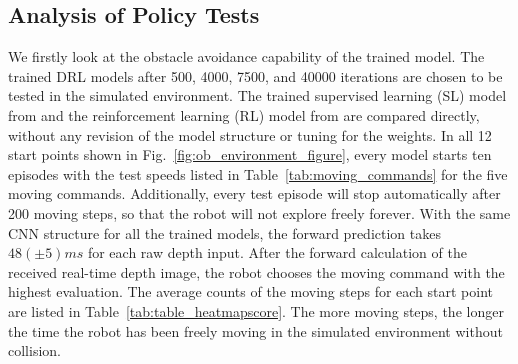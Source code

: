 \subsection{Analysis of Policy Tests} \label{sec:analysis}


We firstly look at the obstacle avoidance capability of the trained model. The trained DRL models after 500, 4000, 7500, and 40000 iterations are chosen to be tested in the simulated environment. The trained supervised learning (SL) model from \cite{tai2016deep} and the reinforcement learning (RL) model from \cite{tl_rcar_2016} are compared directly, without any revision of the model structure or tuning for the weights. In all 12 start points shown in Fig.~\ref{fig:ob_environment_figure}, every model starts ten episodes with the test speeds listed in Table~\ref{tab:moving_commands} for the five moving commands. Additionally, every test episode will stop automatically after 200 moving steps, so that the robot will not explore freely forever. With the same CNN structure for all the trained models, the forward prediction takes $48(\pm5)ms$ for each raw depth input.
After the forward calculation of the received real-time depth image, the robot chooses the moving command with the highest evaluation. The average counts of the moving steps for each start point are listed in Table~\ref{tab:table_heatmapscore}. The more moving steps, the longer the time the robot has been freely moving in the simulated environment without collision.
